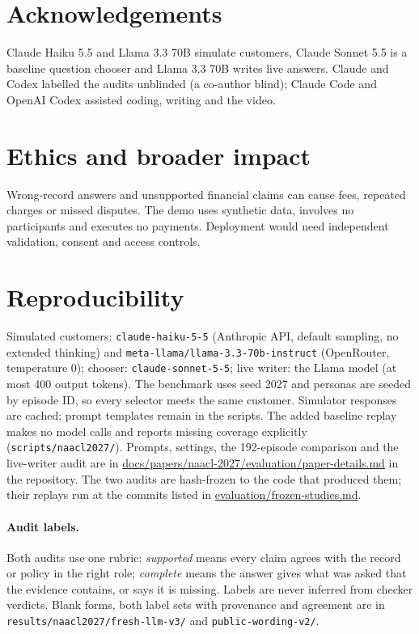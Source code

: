 \documentclass[11pt]{article}
\begin{document}
\section*{Acknowledgements}

Claude Haiku 5.5 and Llama 3.3 70B simulate customers, Claude Sonnet 5.5 is a baseline question
chooser and Llama 3.3 70B writes live answers. Claude and Codex labelled the audits unblinded (a
co-author blind); Claude Code and OpenAI Codex assisted coding, writing and the video.

\section*{Ethics and broader impact}

Wrong-record answers and unsupported financial claims can cause fees, repeated charges or missed
disputes. The demo uses synthetic data, involves no participants and executes no payments.
Deployment would need independent validation, consent and access controls.



\clearpage
\appendix
\raggedbottom

\section{Reproducibility}
\label{app:repro}

Simulated customers: \texttt{claude-haiku-5-5} (Anthropic API, default sampling, no extended
thinking) and \texttt{meta-llama/llama-3.3-70b-instruct} (OpenRouter, temperature 0); chooser:
\texttt{claude-sonnet-5-5}; live writer: the Llama model (at most 400 output tokens). The benchmark
uses seed 2027 and personas are seeded by episode ID, so every selector meets the same customer.
Simulator responses are cached; prompt templates remain in the scripts. The added baseline
replay makes no model calls and reports missing coverage explicitly
(\texttt{scripts/naacl2027/}). Prompts, settings, the 192-episode comparison and the live-writer
audit are in \url{docs/papers/naacl-2027/evaluation/paper-details.md} in the repository. The two audits are
hash-frozen to the code that produced them; their replays run at the commits listed in
\url{evaluation/frozen-studies.md}.

\paragraph{Audit labels.} Both audits use one rubric: \emph{supported} means every claim agrees
with the record or policy in the right role; \emph{complete} means the answer gives what was asked
that the evidence contains, or says it is missing. Labels are never inferred from checker
verdicts. Blank forms, both label sets with provenance and agreement are in
\texttt{results/naacl2027/fresh-llm-v3/} and \texttt{public-wording-v2/}.
\end{document}

